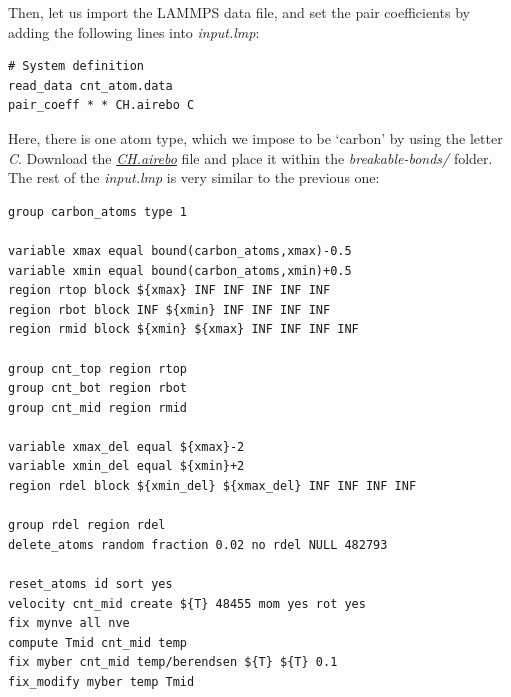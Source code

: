 \documentclass[9pt,tutorial]{livecoms}
\newcommand{\filepath}{https://raw.githubusercontent.com/lammpstutorials/lammpstutorials-article/main/files/}
\begin{document}
Then, let us import the LAMMPS data file, and set the pair coefficients by adding
the following lines into \textit{input.lmp}:
\begin{lstlisting}
# System definition
read_data cnt_atom.data
pair_coeff * * CH.airebo C
\end{lstlisting}
Here, there is one atom type, which we impose to be `carbon' by using
the letter \textit{C}. Download the \href{\filepath tutorial2/breakable-bonds/CH.airebo}{\textit{CH.airebo}}
file and place it within the \textit{breakable-bonds/} folder. The rest of the
\textit{input.lmp} is very similar to the previous one:

\begin{lstlisting}
group carbon_atoms type 1

variable xmax equal bound(carbon_atoms,xmax)-0.5
variable xmin equal bound(carbon_atoms,xmin)+0.5
region rtop block ${xmax} INF INF INF INF INF
region rbot block INF ${xmin} INF INF INF INF
region rmid block ${xmin} ${xmax} INF INF INF INF

group cnt_top region rtop
group cnt_bot region rbot
group cnt_mid region rmid

variable xmax_del equal ${xmax}-2
variable xmin_del equal ${xmin}+2
region rdel block ${xmin_del} ${xmax_del} INF INF INF INF

group rdel region rdel
delete_atoms random fraction 0.02 no rdel NULL 482793

reset_atoms id sort yes
velocity cnt_mid create ${T} 48455 mom yes rot yes
fix mynve all nve
compute Tmid cnt_mid temp
fix myber cnt_mid temp/berendsen ${T} ${T} 0.1
fix_modify myber temp Tmid
\end{lstlisting}
\end{document}
